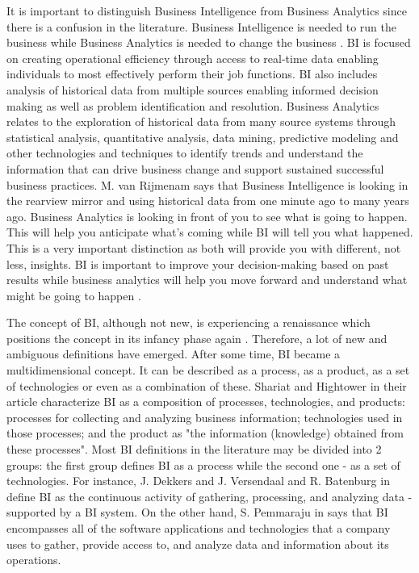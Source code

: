 \documentclass[runningheads]{llncs}
\begin{document}
It is important to distinguish Business Intelligence from Business Analytics since there is a confusion in the literature.  Business Intelligence is needed to run the business while Business Analytics is needed to change the business \cite{HEINZE}. BI is focused on creating operational efficiency through access to real-time data enabling individuals to most effectively perform their job functions. BI also includes analysis of historical data from multiple sources enabling informed decision making as well as problem identification and resolution. Business Analytics relates to the exploration of historical data from many source systems through statistical analysis, quantitative analysis, data mining, predictive modeling and other technologies and techniques to identify trends and understand the information that can drive business change and support sustained successful business practices. M. van Rijmenam says that Business Intelligence is looking in the rearview mirror and using historical data from one minute ago to many years ago. Business Analytics is looking in front of you to see what is going to happen. This will help you anticipate what's coming while BI will tell you what happened. This is a very important distinction as both will provide you with different, not less, insights. BI is important to improve your decision-making based on past results while business analytics will help you move forward and understand what might be going to happen \cite{HEINZE}.

The concept of BI, although not new, is experiencing a renaissance which positions the concept in its infancy phase again \cite{SHOLLO}. Therefore, a lot of new and ambiguous definitions have emerged. After some time, BI became a multidimensional concept. It can be described as a process, as a product, as a set of technologies or even as a combination of these. Shariat and Hightower in their article \cite{SHARIAT} characterize BI as a composition of processes, technologies, and products: processes for collecting and analyzing business information; technologies used in those processes; and the product as "the information (knowledge) obtained from these processes". Most BI definitions in the literature may be divided into 2 groups: the first group defines BI as a process while the second one - as a set of technologies. For instance, J. Dekkers and J. Versendaal and R. Batenburg in \cite{DEKKERS} define BI as the continuous activity of gathering, processing, and analyzing data - supported by a BI system. On the other hand, S. Pemmaraju in \cite{RELATION} says that BI encompasses all of the software applications and technologies that a company uses to gather, provide access to, and analyze data and information about its operations. 
\end{document}
